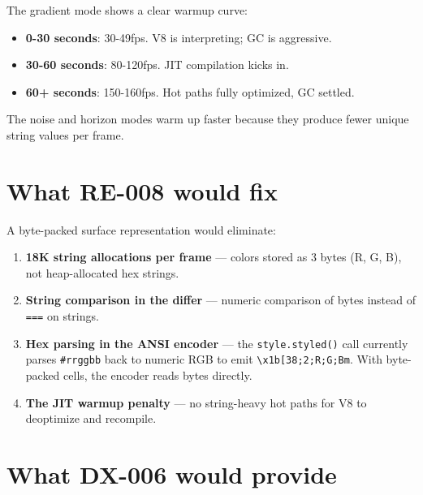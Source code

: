 The gradient mode shows a clear warmup curve:

\begin{itemize}
\tightlist
\item
  \textbf{0-30 seconds}: 30-49fps. V8 is interpreting; GC is aggressive.
\item
  \textbf{30-60 seconds}: 80-120fps. JIT compilation kicks in.
\item
  \textbf{60+ seconds}: 150-160fps. Hot paths fully optimized, GC settled.
\end{itemize}

The noise and horizon modes warm up faster because they produce fewer unique string values per frame.

\section{What RE-008 would fix}\label{record-156-what-re-008-would-fix}

A byte-packed surface representation would eliminate:

\begin{enumerate}
\def\labelenumi{\arabic{enumi}.}
\tightlist
\item
  \textbf{18K string allocations per frame} --- colors stored as 3 bytes (R, G, B), not heap-allocated hex strings.
\item
  \textbf{String comparison in the differ} --- numeric comparison of bytes instead of \texttt{=\allowbreak{}=\allowbreak{}=} on strings.
\item
  \textbf{Hex parsing in the ANSI encoder} --- the \texttt{s\allowbreak{}t\allowbreak{}y\allowbreak{}l\allowbreak{}e\allowbreak{}.\allowbreak{}s\allowbreak{}t\allowbreak{}y\allowbreak{}l\allowbreak{}e\allowbreak{}d\allowbreak{}(\allowbreak{})} call currently parses \texttt{\#\allowbreak{}r\allowbreak{}r\allowbreak{}g\allowbreak{}g\allowbreak{}b\allowbreak{}b} back to numeric RGB to emit \texttt{\textbackslash{}\allowbreak{}x\allowbreak{}1\allowbreak{}b\allowbreak{}[\allowbreak{}3\allowbreak{}8\allowbreak{};\allowbreak{}2\allowbreak{};\allowbreak{}R\allowbreak{};\allowbreak{}G\allowbreak{};\allowbreak{}B\allowbreak{}m}. With byte-packed cells, the encoder reads bytes directly.
\item
  \textbf{The JIT warmup penalty} --- no string-heavy hot paths for V8 to deoptimize and recompile.
\end{enumerate}

\section{What DX-006 would provide}\label{record-156-what-dx-006-would-provide}

